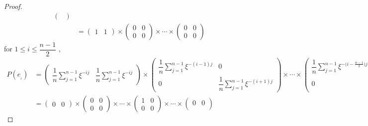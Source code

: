 \documentclass{article}
\begin{document}
\begin{proof}
\begin{align*}
\begin{pmatrix}
        \end{pmatrix}\\
        &=\begin{pmatrix}
          1&1  
        \end{pmatrix}
        \times
        \begin{pmatrix}
            0&0\\
            0&0
        \end{pmatrix}
        \times\cdots\times
        \begin{pmatrix}
            0&0\\
            0&0
        \end{pmatrix}
    \end{align*}
    for $1\leq i\leq\dfrac{n-1}{2}$ , 
    \begin{align*}
        P(e_{_i})&=\begin{pmatrix}
        \dfrac{1}{n}\sum\limits_{j=1}^{n-1}\xi^{\scriptscriptstyle-ij}&\dfrac{1}{n}\sum\limits_{j=1}^{n-1}\xi^{\scriptscriptstyle-ij}
    \end{pmatrix}
    \times
        \begin{pmatrix}
            \dfrac{1}{n}\sum\limits_{j=1}^{n-1}\xi^{\scriptscriptstyle -(i-1)j}&0\\
            0&\dfrac{1}{n}\sum\limits_{j=1}^{n-1}\xi^{\scriptscriptstyle-(i+1)j}
        \end{pmatrix}
        \times\cdots\times
        \begin{pmatrix}
            \dfrac{1}{n}\sum\limits_{j=1}^{n-1}\xi^{-({\scriptscriptstyle i-\frac{n-1}{2})j}}&0\\
            0&\dfrac{1}{n}\sum\limits_{j=1}^{n-1}\xi^{-({\scriptscriptstyle i+\frac{n-1}{2})j}}
        \end{pmatrix}\\
        &=\begin{pmatrix}
          0&0
        \end{pmatrix}
        \times
        \begin{pmatrix}
            0&0\\
            0&0
        \end{pmatrix}
        \times\cdots\times
        \begin{pmatrix}
            1&0\\
            0&0
        \end{pmatrix}
        \times\cdots\times
        \begin{pmatrix}
            0&0\\

\end{pmatrix}
\end{align*}
\end{proof}
\end{document}
